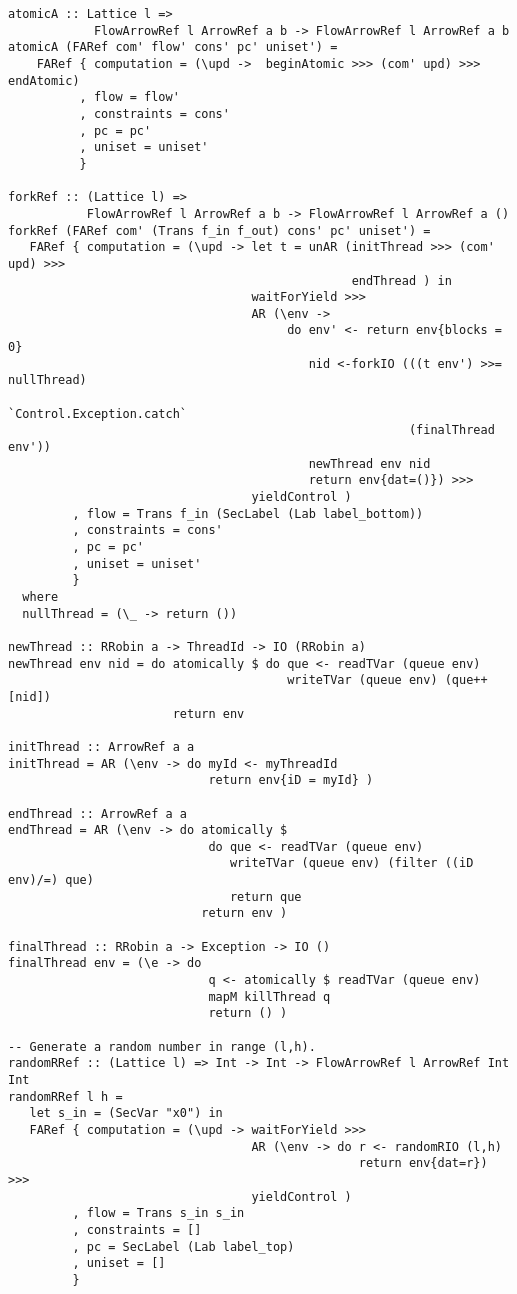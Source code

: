 \begin{Verbatim}[fontsize=\footnotesize,frame=lines,
                 framesep=5mm, label={[FlowArrowRef.hs]FlowArrowRef.hs}]
atomicA :: Lattice l => 
            FlowArrowRef l ArrowRef a b -> FlowArrowRef l ArrowRef a b
atomicA (FARef com' flow' cons' pc' uniset') =
    FARef { computation = (\upd ->  beginAtomic >>> (com' upd) >>> endAtomic)
          , flow = flow'
          , constraints = cons'
          , pc = pc'
          , uniset = uniset'
          }

forkRef :: (Lattice l) => 
           FlowArrowRef l ArrowRef a b -> FlowArrowRef l ArrowRef a ()
forkRef (FARef com' (Trans f_in f_out) cons' pc' uniset') =
   FARef { computation = (\upd -> let t = unAR (initThread >>> (com' upd) >>> 
                                                endThread ) in
                                  waitForYield >>>
                                  AR (\env -> 
                                       do env' <- return env{blocks = 0}
                                          nid <-forkIO (((t env') >>= nullThread) 
                                                       `Control.Exception.catch` 
                                                        (finalThread env'))
                                          newThread env nid
                                          return env{dat=()}) >>>
                                  yieldControl )
         , flow = Trans f_in (SecLabel (Lab label_bottom))
         , constraints = cons'
         , pc = pc'
         , uniset = uniset'
         }
  where
  nullThread = (\_ -> return ())

newThread :: RRobin a -> ThreadId -> IO (RRobin a)
newThread env nid = do atomically $ do que <- readTVar (queue env)
                                       writeTVar (queue env) (que++[nid])
                       return env

initThread :: ArrowRef a a
initThread = AR (\env -> do myId <- myThreadId
                            return env{iD = myId} )

endThread :: ArrowRef a a
endThread = AR (\env -> do atomically $
                            do que <- readTVar (queue env)
                               writeTVar (queue env) (filter ((iD env)/=) que) 
                               return que
                           return env )

finalThread :: RRobin a -> Exception -> IO ()
finalThread env = (\e -> do 
                            q <- atomically $ readTVar (queue env)
                            mapM killThread q
                            return () )

-- Generate a random number in range (l,h).
randomRRef :: (Lattice l) => Int -> Int -> FlowArrowRef l ArrowRef Int Int
randomRRef l h =
   let s_in = (SecVar "x0") in
   FARef { computation = (\upd -> waitForYield >>>
                                  AR (\env -> do r <- randomRIO (l,h)
                                                 return env{dat=r}) >>>
                                  yieldControl )
         , flow = Trans s_in s_in
         , constraints = []
         , pc = SecLabel (Lab label_top)
         , uniset = []
         }
\end{Verbatim}
